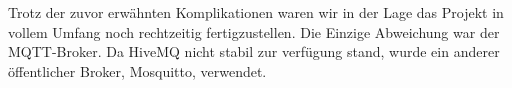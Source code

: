 Trotz der zuvor erwähnten Komplikationen waren wir in der Lage das Projekt in vollem Umfang noch rechtzeitig fertigzustellen.
Die Einzige Abweichung war der MQTT-Broker. Da HiveMQ nicht stabil zur verfügung stand, wurde ein anderer öffentlicher Broker, Mosquitto, verwendet.
